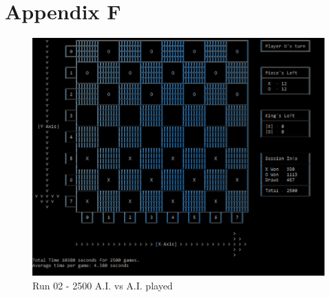\documentclass[10pt, a4paper]{article}
\begin{document}
\newpage
\section{Appendix F}

\begin{figure}[H]
	\centering
	\includegraphics[scale=0.8]{RunTwo2500}
	\caption{Run 02 - 2500 A.I. vs A.I. played}
\end{figure}   
\end{document}
